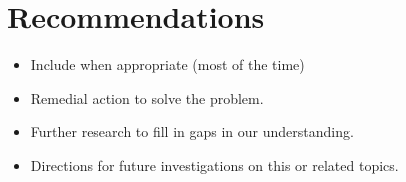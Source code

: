 \chapter{Recommendations}
\begin{itemize}
  \item Include when appropriate (most of the time)
  \item Remedial action to solve the problem.
  \item Further research to fill in gaps in our understanding.
  \item Directions for future investigations on this or related topics.
\end{itemize}